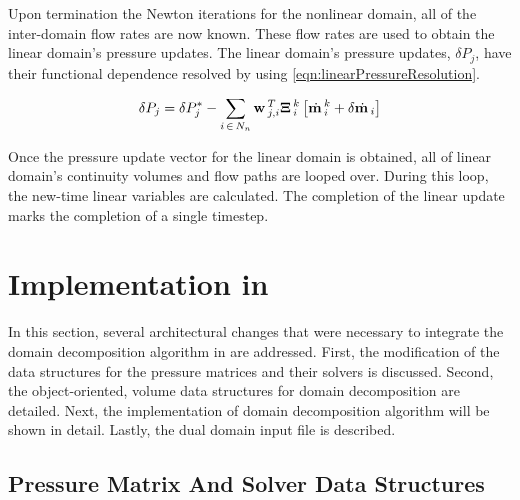 Upon termination the Newton iterations for the nonlinear domain, all of the inter-domain flow rates are now known.
These flow rates are used to obtain the linear domain's pressure updates.
The linear domain's pressure updates, $\delta P_{j}$, have their functional dependence resolved by using \eqref{eqn:linearPressureResolution}.

\begin{equation}
\label{eqn:linearPressureResolution}
\delta P_{j} = \delta P^{*}_{j} - \sum_{i\,\in \, N_{n}} \vec{w}_{j,i}^{T} \vec{\Xi}^{k}_{i} \left[ \momVec{}^{k}_{i} + \delta \momVec{}_{i}\right]
\end{equation}

Once the pressure update vector for the linear domain is obtained, all of linear domain's continuity volumes and flow paths are looped over.
During this loop, the new-time linear variables are calculated.
The completion of the linear update marks the completion of a single timestep.

\section{Implementation in \cobra{}}
\label{sec:dd_algo}

In this section, several architectural changes that were necessary to integrate the domain decomposition algorithm in  are addressed.
First, the modification of the data structures for the pressure matrices and their solvers is discussed.
Second, the object-oriented, volume data structures for domain decomposition are detailed.
Next, the implementation of domain decomposition algorithm will be shown in detail.
Lastly, the dual domain input file is described.

\subsection{Pressure Matrix And Solver Data Structures}
\label{subsect:domDecompSolverStructs}

